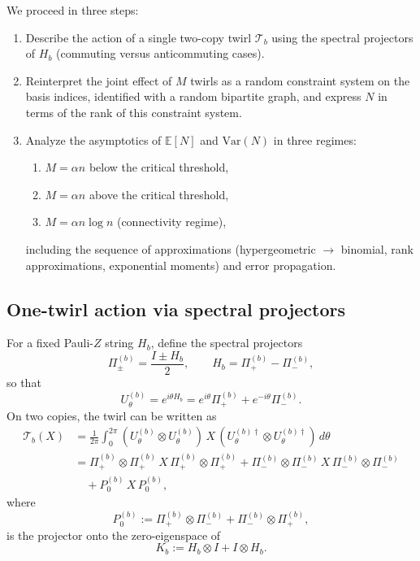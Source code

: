 \documentclass[a4paper,onecolumn,notitlepage,nofootinbib,longbibliography,superscriptaddress, floatfix, pra, aps, 10pt]{revtex4-2}
\begin{document}
We proceed in three steps:
\begin{enumerate}
  \item Describe the action of a single two-copy twirl $\mathcal{T}_b$ using the spectral projectors of $H_b$ (commuting versus anticommuting cases).
  \item Reinterpret the joint effect of $M$ twirls as a random constraint system on the basis indices, identified with a random bipartite graph, and express $N$ in terms of the rank of this constraint system.
  \item Analyze the asymptotics of $\mathbb{E}[N]$ and $\mathrm{Var}(N)$ in three regimes:
        \begin{enumerate}
          \item $M=\alpha n$ below the critical threshold,
          \item $M=\alpha n$ above the critical threshold,
          \item $M=\alpha n\log n$ (connectivity regime),
        \end{enumerate}
        including the sequence of approximations (hypergeometric $\to$ binomial, rank approximations, exponential moments) and error propagation.
\end{enumerate}

\subsection{One-twirl action via spectral projectors}

For a fixed Pauli-$Z$ string $H_b$, define the spectral projectors
\begin{equation}
  \Pi_\pm^{(b)} = \frac{I\pm H_b}{2},
  \qquad H_b = \Pi_+^{(b)} - \Pi_-^{(b)},
\end{equation}
so that
\begin{equation}
  U_\theta^{(b)} = e^{i\theta H_b} = e^{i\theta}\Pi_+^{(b)} + e^{-i\theta}\Pi_-^{(b)}.
\end{equation}
On two copies, the twirl can be written as
\begin{equation}
\begin{split}
  \mathcal{T}_b(X)
  &= \frac{1}{2\pi}\int_0^{2\pi} 
     (U_\theta^{(b)}\otimes U_\theta^{(b)})\,X\,
     (U_\theta^{(b)\dagger}\otimes U_\theta^{(b)\dagger})\,d\theta \\
  &= \Pi_+^{(b)}\otimes\Pi_+^{(b)}\,X\,\Pi_+^{(b)}\otimes\Pi_+^{(b)}
   + \Pi_-^{(b)}\otimes\Pi_-^{(b)}\,X\,\Pi_-^{(b)}\otimes\Pi_-^{(b)} \\
  &\quad + P_0^{(b)}\,X\,P_0^{(b)},
\end{split}
\end{equation}
where
\begin{equation}
  P_0^{(b)} := \Pi_+^{(b)}\otimes\Pi_-^{(b)} + \Pi_-^{(b)}\otimes\Pi_+^{(b)},
\end{equation}
is the projector onto the zero-eigenspace of
\begin{equation}
  K_b := H_b\otimes I + I\otimes H_b.
\end{equation}
\end{document}
